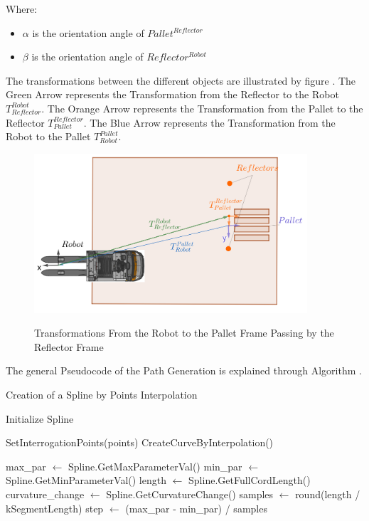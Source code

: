 Where:
\begin{itemize}
    \item \( \alpha \) is the orientation angle of $Pallet^{Reflector}$
    \item \( \beta \) is the orientation angle of $Reflector^{Robot}$
\end{itemize}

The transformations between the different objects are illustrated by figure .
The Green Arrow represents the Transformation from the Reflector to the Robot $T_{Reflector}^{Robot}$.
The Orange Arrow represents the Transformation from the Pallet to the Reflector $T_{Pallet}^{Reflector}$.
The Blue Arrow represents the Transformation from the Robot to the Pallet $T_{Robot}^{Pallet}$.

\begin{figure}[H]
    \begin{center}
        \includegraphics[width=4in]{images/Chap2/Transformation.png}\\
        \caption{Transformations From the Robot to the Pallet Frame Passing by the Reflector
        Frame}
        \label{Transformation}
        \end{center}    
\end{figure}

The general Pseudocode of the Path Generation is explained through Algorithm .

\begin{algorithm}[H]
    \caption{Creation of a Spline by Points Interpolation}\label{alg:createSplines}

    \SetAlgoLined
    
    Initialize Spline\;
    
    SetInterrogationPoints(points)\;
    CreateCurveByInterpolation()\;
    
    max\_par $\gets$ Spline.GetMaxParameterVal()\;
    min\_par $\gets$ Spline.GetMinParameterVal()\;
    length $\gets$ Spline.GetFullCordLength()\;
    curvature\_change $\gets$ Spline.GetCurvatureChange()\;
    samples $\gets$ round(length / kSegmentLength)\;
    step $\gets$ (max\_par - min\_par) / samples\;
    
    
    \;
    
    \end{algorithm}




